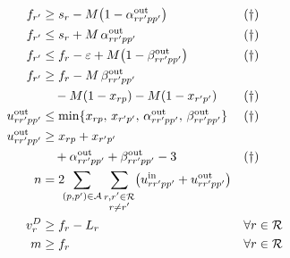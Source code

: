\begin{align}
  f_{r'} &\ge s_r - M\bigl(1 - \alpha^{\mathrm{out}}_{rr'pp'}\bigr)
    && (\dagger) \label{eq:alphaOutLB}\\
  f_{r'} &\le s_r + M\,\alpha^{\mathrm{out}}_{rr'pp'}
    && (\dagger) \label{eq:alphaOutUB}\\
  f_{r'} &\le f_r - \varepsilon
              + M\bigl(1 - \beta^{\mathrm{out}}_{rr'pp'}\bigr)
    && (\dagger) \label{eq:betaOutUB}\\
  f_{r'} &\ge f_r - M\,\beta^{\mathrm{out}}_{rr'pp'} \notag\\
         &\quad - M(1 - x_{rp}) - M(1 - x_{r'p'})
    && (\dagger) \label{eq:betaOutLB}\\
  u^{\mathrm{out}}_{rr'pp'} &\le \min\{x_{rp},\, x_{r'p'},\,
                                    \alpha^{\mathrm{out}}_{rr'pp'},\,
                                    \beta^{\mathrm{out}}_{rr'pp'}\}
    && (\dagger) \label{eq:uOutUB}\\
  u^{\mathrm{out}}_{rr'pp'} &\ge x_{rp} + x_{r'p'} \notag\\
                            &\quad + \alpha^{\mathrm{out}}_{rr'pp'}
                            + \beta^{\mathrm{out}}_{rr'pp'} - 3
    && (\dagger) \label{eq:uOut}\\
  n &= 2 \!\!\sum_{(p,p') \in \mathcal{A}}
         \sum_{\substack{r, r' \in \mathcal{R}\\ r \ne r'}}
         \bigl(u^{\mathrm{in}}_{rr'pp'} + u^{\mathrm{out}}_{rr'pp'}\bigr)
    && \label{eq:movements}\\
  v^D_r &\ge f_r - L_r
    && \forall r \in \mathcal{R} \label{eq:delay}\\
  m &\ge f_r
    && \forall r \in \mathcal{R} \label{eq:makespan}
\end{align}

